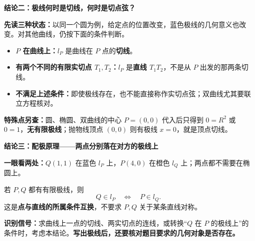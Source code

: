 \begin{statementbox}
\begin{samepage}
\textbf{\textcolor{CStatement}{结论二：极线何时是切线，何时是切点弦？}}

\begin{center}\end{center}
\noindent\textbf{先读三种状态：}以同一个圆为例，给定点的位置改变，蓝色极线的几何意义也改变。对其他曲线，仍按下面的条件判断。
\end{samepage}

\begin{itemize}[leftmargin=*,itemsep=0.35em]
\item \textbf{$P$ 在曲线上：}$l_P$ 是曲线在 $P$ 点的\textbf{切线}。
\item \textbf{有两个不同的有限实切点 $T_1,T_2$：}$l_P$ 是\textbf{直线 $T_1T_2$}，不是从 $P$ 出发的那两条切线。
\item \textbf{不满足上述条件：}即使极线存在，也不能直接称作实切点弦；双曲线尤其要联立方程核对。
\end{itemize}

\textbf{特殊点另查：}圆、椭圆、双曲线的中心 $P=(0,0)$ 代入后只得到 $0=R^2$ 或 $0=1$，\textbf{无有限极线}；抛物线顶点 $(0,0)$ 则有极线 $x=0$，就是顶点切线。
\end{statementbox}

\begin{statementbox}
\begin{samepage}
\textbf{\textcolor{CStatement}{结论三：配极原理——两点分别落在对方的极线上}}

\begin{center}\end{center}
\noindent\textbf{一眼看两处：}$Q(1,1)$ 在蓝色 $l_P$ 上，$P(4,0)$ 在橙色 $l_Q$ 上；两点都不需要在椭圆上。
\end{samepage}

若 $P,Q$ 都有有限极线，则
\[\boxed{Q\in l_P\quad\Longleftrightarrow\quad P\in l_Q.}\]
这是\textbf{点与直线的所属条件互换}，不要求 $P,Q$ 关于某条直线对称。

\medskip
\textbf{识别信号：}求曲线上一点的切线、两实切点的连线，或转换“$Q$ 在 $P$ 的极线上”的条件时，考虑本结论。\textbf{写出极线后，还要核对题目要求的几何对象是否存在。}
\end{statementbox}
